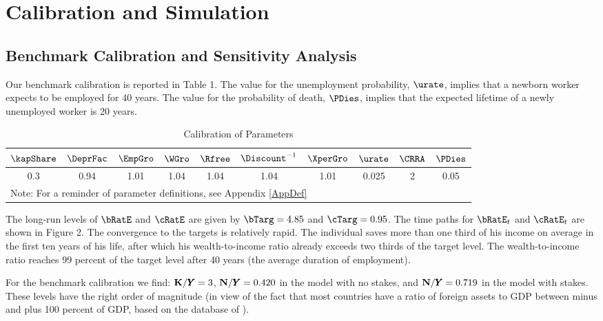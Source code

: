 \documentclass[titlepage]{\econtex}\newcommand{\texname}{cjSOE}
\renewcommand{\GDPLev}{\ensuremath{\pmb{Y}}}
\begin{document}
\section{Calibration and Simulation}

\hypertarget{calibration}{}
\subsection{Benchmark Calibration and Sensitivity Analysis}

Our benchmark calibration is reported in Table 1. The value for the unemployment probability, $\urate$, implies that a newborn worker expects to be employed for 40 years. The value for the probability of death, $\PDies$, implies that the expected lifetime of a newly unemployed worker is 20 years.

\medskip

\begin{table}
  \caption{Calibration of Parameters}\label{table:calibration}
\begin{center}
\begin{tabular}{|c|c|c|c|c|c|c|c|c|c|}
  \hline
  $\kapShare$ & $\DeprFac$ & $\EmpGro$ & $\WGro$ & $\Rfree$ & $\Discount^{-1}$ & $\XperGro$ & $\urate$ & $\CRRA$ & $\PDies$ \\ \hline
  0.3 & 0.94 & 1.01 & 1.04 & 1.04 & 1.04 & 1.01 & 0.025 & 2 & 0.05 \\
  \hline
\multicolumn{10}{l}{\small Note: For a reminder of parameter definitions, see Appendix \ref{AppDef}} \\
\end{tabular}
\end{center}
\end{table}

The long-run levels of $\bRatE$ and $\cRatE$ are given by
$\bTarg=4.85$ and $\cTarg=0.95$. The time paths for $\bRatE_{t}$ and $\cRatE_{t}$
are shown in Figure 2. The convergence to the targets is relatively
rapid. The individual saves more than one third of his income on
average in the first ten years of his life, after which his
wealth-to-income ratio already exceeds two thirds of the target
level. The wealth-to-income ratio reaches 99 percent of the target
level after 40 years (the average duration of employment).

For the benchmark calibration we find: $\KLev/\GDPLev=3$, $\NFALev/\GDPLev=0.420$ in the model with no stakes, and $\NFALev/\GDPLev=0.719$ in the model with stakes. These levels have the right order of magnitude (in view of the fact that most countries have a ratio of foreign assets to GDP between minus and plus 100 percent of GDP, based on the database of \cite{lmf:mark2}).
\end{document}
